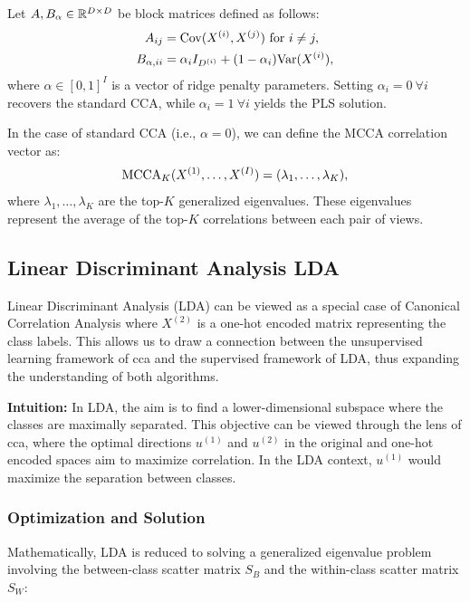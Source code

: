 Let $A,B_\alpha \in \mathbb{R}^{D \times D}$ be block matrices defined as follows:
\begin{align}
    A_{ij} &= \mathrm{Cov}(X^{(i)}, X^{(j)}) \text{ for } i \neq j, \\
    B_{\alpha,ii} &= \alpha_i I_{D^{(i)}} + (1-\alpha_i) \mathrm{Var}(X^{(i)}),
\end{align}
where $\alpha \in [0,1]^I$ is a vector of ridge penalty parameters. Setting $\alpha_i = 0 \: \forall i$ recovers the standard CCA, while $\alpha_i = 1 \: \forall i$ yields the PLS solution.

In the case of standard CCA (i.e., $\alpha=0$), we can define the MCCA correlation vector as:
\begin{align}\label{eq:MCCA}
    \operatorname{MCCA}_K(X^{(1)},\dots,X^{(I)}) = (\lambda_1, \dots, \lambda_K),
\end{align}
where $\lambda_1, \dots, \lambda_K$ are the top-$K$ generalized eigenvalues. These eigenvalues represent the average of the top-$K$ correlations between each pair of views.

\subsection{Linear Discriminant Analysis LDA}

Linear Discriminant Analysis (LDA) can be viewed as a special case of Canonical Correlation Analysis where \(X^{(2)}\) is a one-hot encoded matrix representing the class labels.
This allows us to draw a connection between the unsupervised learning framework of \acrshort{cca} and the supervised framework of LDA\citep{balakrishnama1998linear,riffenburgh1957linear}, thus expanding the understanding of both algorithms.

\textbf{Intuition:} In LDA, the aim is to find a lower-dimensional subspace where the classes are maximally separated. This objective can be viewed through the lens of \acrshort{cca}, where the optimal directions \(u^{(1)}\) and \(u^{(2)}\) in the original and one-hot encoded spaces aim to maximize correlation. In the LDA context, \(u^{(1)}\) would maximize the separation between classes.

\subsubsection{Optimization and Solution}

Mathematically, LDA is reduced to solving a generalized eigenvalue problem involving the between-class scatter matrix \(S_B\) and the within-class scatter matrix \(S_W\):

